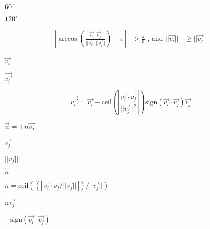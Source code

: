 \documentclass{article}
\begin{document}
$60^\circ$
\pagebreak

$120^\circ$
\pagebreak

\begin{eqnarray} \left| \arccos\left(\frac{\vec{v_i}\cdot \vec{v_j}} {||\vec{v_i}||\,||\vec{v_j}||} \right) - \pi \right| &> \frac{\pi}{3} \mbox{\ ,\ and\ } ||\vec{v_i}|| &\geq ||\vec{v_j}|| \end{eqnarray}
\pagebreak

$\vec{v_i}$
\pagebreak

$\vec{v_i'}$
\pagebreak

\[ \vec{v_i'} = \vec{v_i} - \mbox{ceil}\left(\left|\frac{\vec{v_i}\cdot \vec{v_j}} {||\vec{v_j}||^2}\right|\right)\mbox{sign}(\vec{v_i}\cdot \vec{v_j})\vec{v_j} \]
\pagebreak

$\vec{a} = \pm n \vec{v_j}$
\pagebreak

$\vec{v_j}$
\pagebreak

$||\vec{v_j}||$
\pagebreak

$n$
\pagebreak

$n = \mbox{ceil}\left(\left(\left|\,\vec{v_i}\cdot \vec{v_j}/ ||\vec{v_j}||\,\right|\right)/||\vec{v_j}||\right)$
\pagebreak

$n\vec{v_j}$
\pagebreak

$-\mbox{sign}(\vec{v_i}\cdot\vec{v_j})$
\pagebreak
\end{document}
